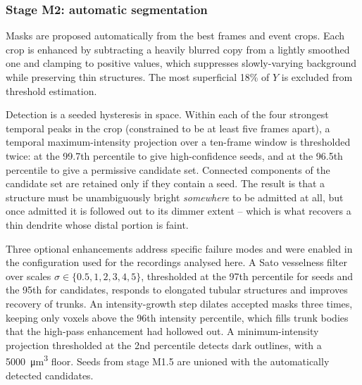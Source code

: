 
		\subsubsection{Stage M2: automatic segmentation}

			Masks are proposed automatically from the best frames and event
			crops. Each crop is enhanced by subtracting a heavily blurred copy
			from a lightly smoothed one and clamping to positive values, which
			suppresses slowly-varying background while preserving thin
			structures. The most superficial 18\% of $Y$ is excluded from
			threshold estimation.

			Detection is a seeded hysteresis in space.
			Within each of the four strongest temporal peaks in the crop
			(constrained to be at least five frames apart), a temporal
			maximum-intensity projection over a ten-frame window is thresholded
			twice: at the 99.7th percentile to give high-confidence seeds, and at
			the 96.5th percentile to give a permissive candidate set.
			Connected components of the candidate set are retained only if they
			contain a seed.
			The result is that a structure must be unambiguously bright
			\emph{somewhere} to be admitted at all, but once admitted it is
			followed out to its dimmer extent -- which is what recovers a thin
			dendrite whose distal portion is faint.

			Three optional enhancements address specific failure modes and were
			enabled in the configuration used for the recordings analysed here.
			A Sato vesselness filter over scales
			$\sigma \in \{0.5, 1, 2, 3, 4, 5\}$, thresholded at the 97th
			percentile for seeds and the 95th for candidates, responds to
			elongated tubular structures and improves recovery of trunks.
			An intensity-growth step dilates accepted masks three times, keeping
			only voxels above the 96th intensity percentile, which fills trunk
			bodies that the high-pass enhancement had hollowed out.
			A minimum-intensity projection thresholded at the 2nd percentile
			detects dark outlines, with a \SI{5000}{\micro\meter\cubed} floor.
			Seeds from stage M1.5 are unioned with the automatically detected
			candidates.

